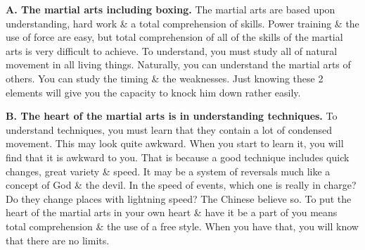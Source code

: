 \documentclass[oneside]{book}
\numberwithin{equation}{section}
\begin{document}
\textbf{A. The martial arts including boxing.} The martial arts are based upon understanding, hard work \& a total comprehension of skills. Power training \& the use of force are easy, but total comprehension of all of the skills of the martial arts is very difficult to achieve. To understand, you must study all of natural movement in all living things. Naturally, you can understand the martial arts of others. You can study the timing \& the weaknesses. Just knowing these 2 elements will give you the capacity to knock him down rather easily.

\textbf{B. The heart of the martial arts is in understanding techniques.} To understand techniques, you must learn that they contain a lot of condensed movement. This may look quite awkward. When you start to learn it, you will find that it is awkward to you. That is because a good technique includes quick changes, great variety \& speed. It may be a system of reversals much like a concept of God \& the devil. In the speed of events, which one is really in charge? Do they change places with lightning speed? The Chinese believe so. To put the heart of the martial arts in your own heart \& have it be a part of you means total comprehension \& the use of a free style. When you have that, you will know that there are no limits.
\end{document}

